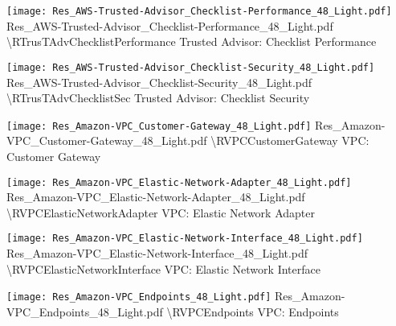  {\texttt{[image: Res\_AWS-Trusted-Advisor\_Checklist-Performance\_48\_Light.pdf]}} {Res\_AWS-Trusted-Advisor\_Checklist-Performance\_48\_Light.pdf} {{\textbackslash}RTrusTAdvChecklistPerformance} {Trusted Advisor: Checklist Performance}

 {\texttt{[image: Res\_AWS-Trusted-Advisor\_Checklist-Security\_48\_Light.pdf]}} {Res\_AWS-Trusted-Advisor\_Checklist-Security\_48\_Light.pdf} {{\textbackslash}RTrusTAdvChecklistSec} {Trusted Advisor: Checklist Security}

 {\texttt{[image: Res\_Amazon-VPC\_Customer-Gateway\_48\_Light.pdf]}} {Res\_Amazon-VPC\_Customer-Gateway\_48\_Light.pdf} {{\textbackslash}RVPCCustomerGateway} {VPC: Customer Gateway}

 {\texttt{[image: Res\_Amazon-VPC\_Elastic-Network-Adapter\_48\_Light.pdf]}} {Res\_Amazon-VPC\_Elastic-Network-Adapter\_48\_Light.pdf} {{\textbackslash}RVPCElasticNetworkAdapter} {VPC: Elastic Network Adapter}

 {\texttt{[image: Res\_Amazon-VPC\_Elastic-Network-Interface\_48\_Light.pdf]}} {Res\_Amazon-VPC\_Elastic-Network-Interface\_48\_Light.pdf} {{\textbackslash}RVPCElasticNetworkInterface} {VPC: Elastic Network Interface}

 {\texttt{[image: Res\_Amazon-VPC\_Endpoints\_48\_Light.pdf]}} {Res\_Amazon-VPC\_Endpoints\_48\_Light.pdf} {{\textbackslash}RVPCEndpoints} {VPC: Endpoints}

